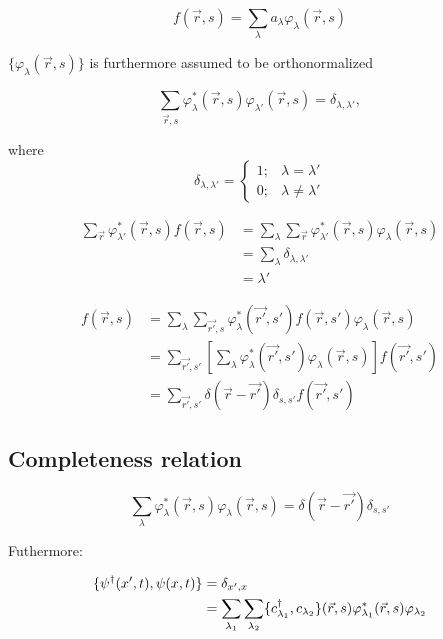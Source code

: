 \begin{equation}
	f(\vec{r},s) = \sum_\lambda a_\lambda \varphi_\lambda (\vec{r}, s)
\end{equation}

$\{ \varphi_\lambda(\vec{r},s) \}$ is furthermore assumed to be orthonormalized

\begin{equation}
	\sum_{\vec{r},s} \varphi_\lambda^* (\vec{r},s) \varphi_{\lambda'} (\vec{r},s) = \delta_{\lambda, \lambda'},
\end{equation}

where 
\[
	\delta_{\lambda, \lambda'}=
\begin{cases}
	1;& \lambda = \lambda'\\
	0; & \lambda \neq \lambda' 
\end{cases}
\]

\begin{align*}
	\sum_{\vec{r}} \varphi_{\lambda'}^*(\vec{r},s) f(\vec{r},s) &= \sum_\lambda \sum_{\vec{r}} \varphi_{\lambda'}^*(\vec{r},s) \varphi_\lambda(\vec{r},s)\\
	&= \sum_\lambda \delta_{\lambda, \lambda'}\\
	&= \lambda'
\end{align*}

\begin{align*}
	f(\vec{r},s) &= \sum_\lambda \sum_{\vec{r'},s} \varphi_\lambda^* (\vec{r'},s') f(\vec{r},s') \varphi_\lambda (\vec{r},s)\\
	&= \sum_{\vec{r'},s'} \left[ \sum_\lambda \varphi_\lambda^* (\vec{r'},s') \varphi_\lambda (\vec{r},s) \right] f(\vec{r'},s') \\
	&= \sum_{\vec{r'},s'} \delta(\vec{r}-\vec{r'}) \delta_{s,s'} f(\vec{r'},s')
\end{align*}
 
\subsection{Completeness relation}

\begin{equation}
	\sum_\lambda \varphi_\lambda^* (\vec{r},s) \varphi_\lambda(\vec{r},s) = \delta(\vec{r}-\vec{r'}) \delta_{s,s'}
\end{equation}

Futhermore:

\begin{align}
	\{ \psi^\dagger(x',t), \psi(x,t) \} &= \delta_{x',x} \label{complete_1} \\
	&= \sum_{\lambda_1} \sum_{\lambda_2} \{c^{\dagger}_{\lambda_1}, c_{\lambda_2} \} (\vec{r},s)  \varphi_{\lambda_1}^* (\vec{r},s) \varphi_{\lambda_2} \nonumber
\end{align}

